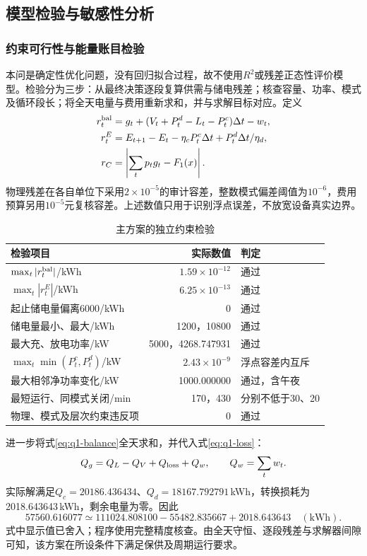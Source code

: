 \documentclass[withoutpreface,bwprint]{cumcmthesis}
\begin{document}
\subsection{模型检验与敏感性分析}
\subsubsection{约束可行性与能量账目检验}
本问是确定性优化问题，没有回归拟合过程，故不使用$R^2$或残差正态性评价模型。检验分为三步：从最终决策逐段复算供需与储电残差；核查容量、功率、模式及循环段长；将全天电量与费用重新求和，并与求解目标对应。定义
\begin{equation}
 \begin{aligned}
 r_t^{\rm bal}&=g_t+(V_t+P_t^d-L_t-P_t^c)\Delta t-w_t,\\
 r_t^E&=E_{t+1}-E_t-\eta_cP_t^c\Delta t+P_t^d\Delta t/\eta_d,\\
 r_C&=\left|\sum_tp_tg_t-F_1(x)\right| .
 \end{aligned}
 \label{eq:q1-audit-residual}
\end{equation}
物理残差在各自单位下采用$2\times10^{-5}$的审计容差，整数模式偏差阈值为$10^{-6}$，费用预算另用$10^{-5}$元复核容差。上述数值只用于识别浮点误差，不放宽设备真实边界。

\begin{table}[htbp]
 \centering\small
 \caption{主方案的独立约束检验}\label{tab:q1-audit}
 \begin{tabular}{lrl}
 \toprule
 检验项目&实际数值&判定\\
 \midrule
 $\max_t|r_t^{\rm bal}|$/kWh&$1.59\times10^{-12}$&通过\\
 $\max_t|r_t^E|$/kWh&$6.25\times10^{-13}$&通过\\
 起止储电量偏离6000/kWh&0&通过\\
 储电量最小、最大/kWh&1200，10800&通过\\
 最大充、放电功率/kW&5000，4268.747931&通过\\
 $\max_t\min(P_t^c,P_t^d)$/kW&$2.43\times10^{-9}$&浮点容差内互斥\\
 最大相邻净功率变化/kW&1000.000000&通过，含午夜\\
 最短运行、同模式关闭/min&170，430&分别不低于30、20\\
 物理、模式及层次约束违反项&0&通过\\
 \bottomrule
 \end{tabular}
\end{table}
进一步将式\eqref{eq:q1-balance}全天求和，并代入式\eqref{eq:q1-loss}：
\begin{equation}
 Q_g=Q_L-Q_V+Q_{\rm loss}+Q_w,\qquad Q_w=\sum_tw_t.
 \label{eq:q1-daily}
\end{equation}
实际解满足$Q_c=20186.436434$、$Q_d=18167.792791$\,kWh，转换损耗为2018.643643\,kWh，剩余电量为零。因此
\begin{equation}
 57560.616077
 \simeq111024.808100-55482.835667+2018.643643
 \quad(\mathrm{kWh}).
 \label{eq:q1-numeric-energy}
\end{equation}
式中显示值已舍入；程序使用完整精度核查。由全天守恒、逐段残差与求解器间隙可知，该方案在所设条件下满足保供及周期运行要求。
\end{document}
